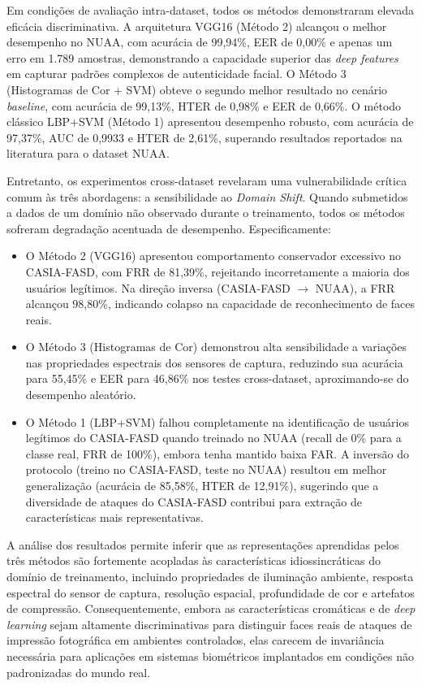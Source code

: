 \documentclass[
	article,			%
	11pt,				%
	oneside,			%
	a4paper,			%
	english,			%
	brazil,				%
	sumario=tradicional
	]{abntex2}
\begin{document}
Em condições de avaliação intra-dataset, todos os métodos demonstraram elevada eficácia discriminativa. A arquitetura VGG16 (Método 2) alcançou o melhor desempenho no NUAA, com acurácia de 99,94\%, EER de 0,00\% e apenas um erro em 1.789 amostras, demonstrando a capacidade superior das \textit{deep features} em capturar padrões complexos de autenticidade facial. O Método 3 (Histogramas de Cor + SVM) obteve o segundo melhor resultado no cenário \textit{baseline}, com acurácia de 99,13\%, HTER de 0,98\% e EER de 0,66\%. O método clássico LBP+SVM (Método 1) apresentou desempenho robusto, com acurácia de 97,37\%, AUC de 0,9933 e HTER de 2,61\%, superando resultados reportados na literatura para o dataset NUAA.

Entretanto, os experimentos cross-dataset revelaram uma vulnerabilidade crítica comum às três abordagens: a sensibilidade ao \textit{Domain Shift}. Quando submetidos a dados de um domínio não observado durante o treinamento, todos os métodos sofreram degradação acentuada de desempenho. Especificamente:

\begin{itemize}
    \item O Método 2 (VGG16) apresentou comportamento conservador excessivo no CASIA-FASD, com FRR de 81,39\%, rejeitando incorretamente a maioria dos usuários legítimos. Na direção inversa (CASIA-FASD $\rightarrow$ NUAA), a FRR alcançou 98,80\%, indicando colapso na capacidade de reconhecimento de faces reais.
    \item O Método 3 (Histogramas de Cor) demonstrou alta sensibilidade a variações nas propriedades espectrais dos sensores de captura, reduzindo sua acurácia para 55,45\% e EER para 46,86\% nos testes cross-dataset, aproximando-se do desempenho aleatório.
    \item O Método 1 (LBP+SVM) falhou completamente na identificação de usuários legítimos do CASIA-FASD quando treinado no NUAA (recall de 0\% para a classe real, FRR de 100\%), embora tenha mantido baixa FAR. A inversão do protocolo (treino no CASIA-FASD, teste no NUAA) resultou em melhor generalização (acurácia de 85,58\%, HTER de 12,91\%), sugerindo que a diversidade de ataques do CASIA-FASD contribui para extração de características mais representativas.
\end{itemize}

A análise dos resultados permite inferir que as representações aprendidas pelos três métodos são fortemente acopladas às características idiossincráticas do domínio de treinamento, incluindo propriedades de iluminação ambiente, resposta espectral do sensor de captura, resolução espacial, profundidade de cor e artefatos de compressão. Consequentemente, embora as características cromáticas e de \textit{deep learning} sejam altamente discriminativas para distinguir faces reais de ataques de impressão fotográfica em ambientes controlados, elas carecem de invariância necessária para aplicações em sistemas biométricos implantados em condições não padronizadas do mundo real.
\end{document}

